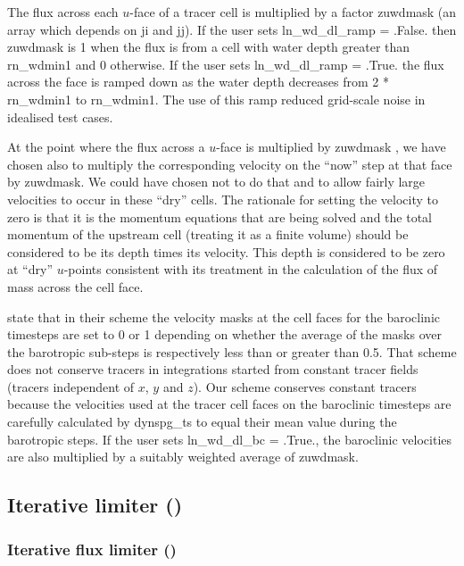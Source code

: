 The flux across each $u$-face of a tracer cell is multiplied by a factor zuwdmask (an array which depends on ji and jj). 
If the user sets ln\_wd\_dl\_ramp = .False. then zuwdmask is 1 when the
flux is from a cell with water depth greater than rn\_wdmin1 and 0 otherwise. If the user sets
ln\_wd\_dl\_ramp = .True. the flux across the face is ramped down as the water depth decreases
from 2 * rn\_wdmin1 to rn\_wdmin1. The use of this ramp reduced grid-scale noise in idealised test cases. 

At the point where the flux across a $u$-face is multiplied by zuwdmask , we have chosen
also to multiply the corresponding velocity on the ``now'' step at that face by zuwdmask. We could have
chosen not to do that and to allow fairly large velocities to occur in these ``dry'' cells. 
The rationale for setting the velocity to zero is that it is the momentum equations that are being solved
and the total momentum of the upstream cell (treating it as a finite volume) should be considered
to be its depth times its velocity. This depth is considered to be zero at ``dry'' $u$-points consistent with its 
treatment in the calculation of the flux of mass across the cell face.         

\cite{WarnerEtal13} state that in their scheme the velocity masks at the cell faces for the baroclinic 
timesteps are set to 0 or 1 depending on whether the average of the masks over the barotropic sub-steps is respectively less than 
or greater than 0.5. That scheme does not conserve tracers in integrations started from constant tracer
fields (tracers independent of $x$, $y$ and $z$). Our scheme conserves constant tracers because
the velocities used at the tracer cell faces on the baroclinic timesteps are carefully calculated by dynspg\_ts
to equal their mean value during the barotropic steps. If the user sets ln\_wd\_dl\_bc = .True., the
baroclinic velocities are also multiplied by a suitably weighted average of zuwdmask.      
     
\subsection   [Iterative limiter (\textit{wet\_dry})]
			{Iterative limiter ()}
\label{DYN_wd_iterative_limiter}

\subsubsection [Iterative flux limiter (\textit{wet\_dry})]
			{Iterative flux limiter ()}
\label{DYN_wd_il_spg_limiter}

